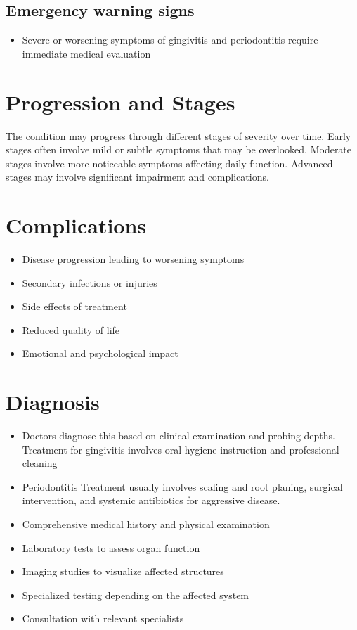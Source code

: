 \subsection{Emergency warning signs}
\begin{itemize}[noitemsep]
  \item Severe or worsening symptoms of gingivitis and periodontitis require immediate medical evaluation
\end{itemize}
\section{Progression and Stages}
The condition may progress through different stages of severity over time. Early stages often involve mild or subtle symptoms that may be overlooked. Moderate stages involve more noticeable symptoms affecting daily function. Advanced stages may involve significant impairment and complications.
\section{Complications}
\begin{itemize}[noitemsep]
  \item Disease progression leading to worsening symptoms
  \item Secondary infections or injuries
  \item Side effects of treatment
  \item Reduced quality of life
  \item Emotional and psychological impact
\end{itemize}
\section{Diagnosis}
\begin{itemize}[noitemsep]
  \item Doctors diagnose this based on clinical examination and probing depths. Treatment for gingivitis involves oral hygiene instruction and professional cleaning
  \item Periodontitis Treatment usually involves scaling and root planing, surgical intervention, and systemic antibiotics for aggressive disease.
  \item Comprehensive medical history and physical examination
  \item Laboratory tests to assess organ function
  \item Imaging studies to visualize affected structures
  \item Specialized testing depending on the affected system
  \item Consultation with relevant specialists
\end{itemize}
